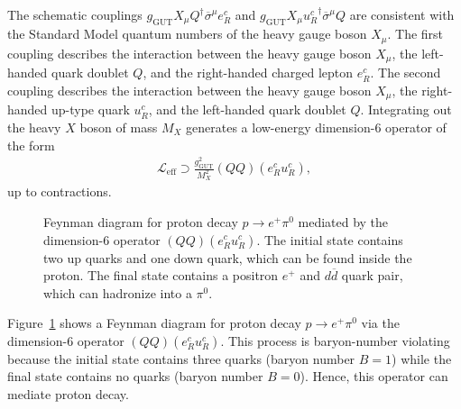 The schematic couplings $g_\text{GUT} X_\mu Q^\dagger \overline{\sigma}^\mu e^c_R$ and $g_\text{GUT} X_\mu {u^c_R}^\dagger \overline{\sigma}^\mu Q$ are consistent with the Standard Model quantum numbers of the heavy gauge boson $X_\mu$. The first coupling describes the interaction between the heavy gauge boson $X_\mu$, the left-handed quark doublet $Q$, and the right-handed charged lepton $e_R^c$. The second coupling describes the interaction between the heavy gauge boson $X_\mu$, the right-handed up-type quark $u_R^c$, and the left-handed quark doublet $Q$. Integrating out the heavy $X$ boson of mass $M_X$ generates a low-energy dimension-6 operator of the form 
\begin{align}
    \mathcal{L}_\text{eff} \supset \frac{g_\text{GUT}^2}{M_X^2} (QQ) (e^c_R u^c_R),
\end{align}
up to contractions. 
\begin{figure}
    \centering
    \caption{Feynman diagram for proton decay $p \to e^+ \pi^0$ mediated by the dimension-6 operator $(QQ)(e_R^c u_R^c)$. The initial state contains two up quarks and one down quark, which can be found inside the proton. The final state contains a positron $e^+$ and $d\overline{d}$ quark pair, which can hadronize into a $\pi^0$.}
    \label{HW7:fig:-Proton-decay}
\end{figure}
Figure~\ref{HW7:fig:-Proton-decay} shows a Feynman diagram for proton decay $p \to e^+ \pi^0$ via the dimension-6 operator $(QQ)(e_R^c u_R^c)$. This process is baryon-number violating because the initial state contains three quarks (baryon number $B=1$) while the final state contains no quarks (baryon number $B=0$). Hence, this operator can mediate proton decay. 

